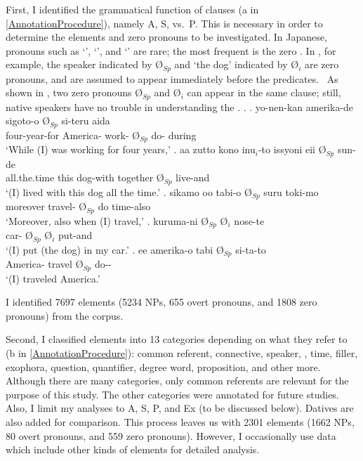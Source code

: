 First,
I identified the grammatical function of clauses (a in \ref{AnnotationProcedure}),
namely A, S, vs.~P.
This is necessary in order to determine the  elements and zero pronouns to be investigated.
In Japanese,
pronouns such as  `',  `', and  `' are rare;
the most frequent  is the zero .
In \Next,
for example, the speaker indicated by {\O$_{Sp}$} and `the dog' indicated by {\O$_{i}$} are zero pronouns,
and are assumed to appear immediately before the predicates.%
	\
As shown in \Next[d],
two zero pronouns {\O$_{Sp}$} and {\O$_{i}$} can appear in the same clause;
still, native speakers have no trouble in understanding the \isi{utterance}.
\ex. \ag. yo-nen-kan amerika-de sigoto-o {\O$_{Sp}$} si-teru aida \\
			four-year-for America- work- {\O$_{Sp}$} do- during \\
			`While (I) was working for four years,'
	\bg. aa zutto kono inu$_{i}$-to issyoni eii {\O$_{Sp}$} sun-de \\
		 all.the.time this dog-with together \ab{fl} {\O$_{Sp}$} live-and \\
		`(I) lived with this dog all the time.'
	\bg. sikamo oo tabi-o {\O$_{Sp}$} suru toki-mo \\
		moreover  travel- {\O$_{Sp}$} do time-also \\
		`Moreover, also when (I) travel,'
	\bg. kuruma-ni {\O$_{Sp}$} {\O$_{i}$} nose-te \\
		car- {\O$_{Sp}$} {\O$_{i}$} put-and \\
		`(I) put (the dog) in my car.'
	\bg. ee amerika-o tabi {\O$_{Sp}$} si-ta-to \\
		 America- travel {\O$_{Sp}$} do-- \\
		`(I) traveled America.'
		\hfill{}

I identified 7697  elements (5234 NPs, 655 overt pronouns, and 1808 zero pronouns) from the corpus.

Second, I classified  elements into 13 categories depending on what they refer to (b in \ref{AnnotationProcedure}):
common referent, connective, speaker, \isi{hearer}, time, filler, exophora, question, quantifier, degree word, proposition, and other more.
Although there are many categories,
only common referents are relevant for the purpose of this study.
The other categories were annotated for future studies.
Also, I limit my analyses to A, S, P, and Ex (to be discussed below).
Datives are also added for comparison.
This process leaves us with
2301 elements (1662 NPs, 80 overt pronouns, and 559 zero pronouns).
However, I occasionally use data which include other kinds of elements
for detailed analysis.

